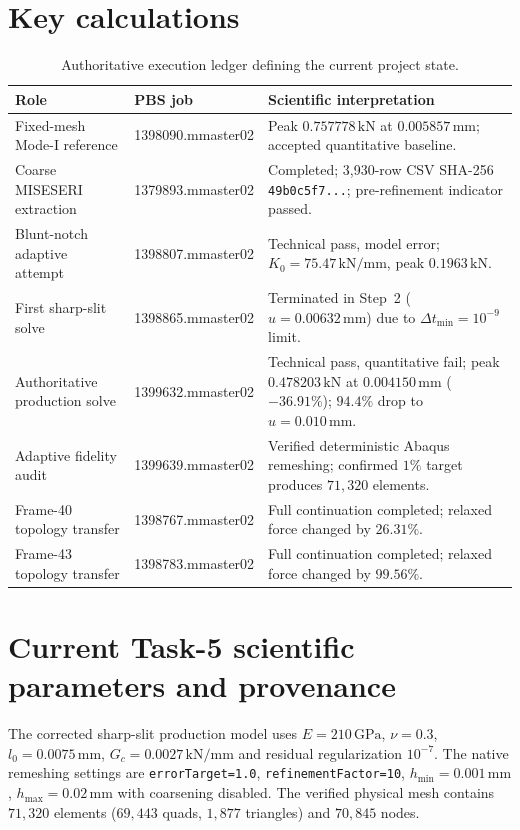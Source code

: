 \section{Key calculations}
\begin{table}[htbp]
\centering
\caption{Authoritative execution ledger defining the current project state.}
\label{tab:app_job_ledger}
\small
\begin{tabular}{p{}p{}p{}}
\toprule
Role & PBS job & Scientific interpretation \\
\midrule
Fixed-mesh Mode-I reference & 1398090.mmaster02 & Peak $0.757778\,\mathrm{kN}$ at $0.005857\,\mathrm{mm}$; accepted quantitative baseline. \\
Coarse MISESERI extraction & 1379893.mmaster02 & Completed; 3,930-row CSV SHA-256 \texttt{49b0c5f7...}; pre-refinement indicator passed. \\
Blunt-notch adaptive attempt & 1398807.mmaster02 & Technical pass, model error; $K_0=75.47\,\mathrm{kN/mm}$, peak $0.1963\,\mathrm{kN}$. \\
First sharp-slit solve & 1398865.mmaster02 & Terminated in Step~2 ($u=0.00632\,\mathrm{mm}$) due to $\Delta t_{\min}=10^{-9}$ limit. \\
Authoritative production solve & 1399632.mmaster02 & Technical pass, quantitative fail; peak $0.478203\,\mathrm{kN}$ at $0.004150\,\mathrm{mm}$ ($-36.91\%$); $94.4\%$ drop to $u=0.010\,\mathrm{mm}$. \\
Adaptive fidelity audit & 1399639.mmaster02 & Verified deterministic Abaqus remeshing; confirmed $1\%$ target produces $71{,}320$ elements. \\
Frame-40 topology transfer & 1398767.mmaster02 & Full continuation completed; relaxed force changed by $26.31\%$. \\
Frame-43 topology transfer & 1398783.mmaster02 & Full continuation completed; relaxed force changed by $99.56\%$. \\
\bottomrule
\end{tabular}
\end{table}

\section{Current Task-5 scientific parameters and provenance}
The corrected sharp-slit production model uses $E=210\,\mathrm{GPa}$, $\nu=0.3$, $l_0=0.0075\,\mathrm{mm}$, $G_c=0.0027\,\mathrm{kN/mm}$ and residual regularization $10^{-7}$. The native remeshing settings are \texttt{errorTarget=1.0}, \texttt{refinementFactor=10}, $h_{\min}=0.001\,\mathrm{mm}$, $h_{\max}=0.02\,\mathrm{mm}$ with coarsening disabled. The verified physical mesh contains $71{,}320$ elements ($69{,}443$ quads, $1{,}877$ triangles) and $70{,}845$ nodes.

